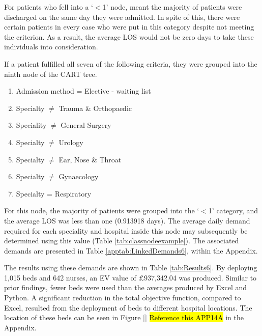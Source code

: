 \documentclass[../thesis.tex]{subfiles}
\begin{document}
For patients who fell into a `$<$1' node, meant the majority of patients were discharged on the same day they were admitted. In spite of this, there were certain patients in every case who were put in this category despite not meeting the criterion. As a result, the average LOS would not be zero days to take these individuals into consideration.

If a patient fulfilled all seven of the following criteria, they were grouped into the ninth node of the CART tree.
\begin{enumerate}
    \item Admission method = Elective - waiting list
    \item Specialty $\neq$ Trauma \& Orthopaedic
    \item Speciality $\neq$ General Surgery
    \item Specialty $\neq$ Urology
    \item Specialty $\neq$ Ear, Nose \& Throat
    \item Specialty $\neq$ Gynaecology
    \item Specialty = Respiratory
\end{enumerate}

For this node, the majority of patients were grouped into the `$<$1' category, and the average LOS was less than one (0.913918 days). The average daily demand required for each speciality and hospital inside this node may subsequently be determined using this value (Table \ref{tab:classnodeexample}). The associated demands are presented in Table \ref{apptab:LinkedDemands6}, within the Appendix.

\begin{table}[h!]
    \centering{}
    \caption{Classification Tree Node Nine - Average LOS}
    \label{tab:classnodeexample}
\end{table}

The results using these demands are shown in Table \ref{tab:Results6}. By deploying 1,015 beds and 642 nurses, an EV value of $\pounds$937,342.04 was produced. Similar to prior findings, fewer beds were used than the averages produced by Excel and Python. A significant reduction in the total objective function, compared to Excel, resulted from the deployment of beds to different hospital locations. The location of these beds can be seen in Figure \ref{} \hl{Reference this APP14A} in the Appendix.
\end{document}
